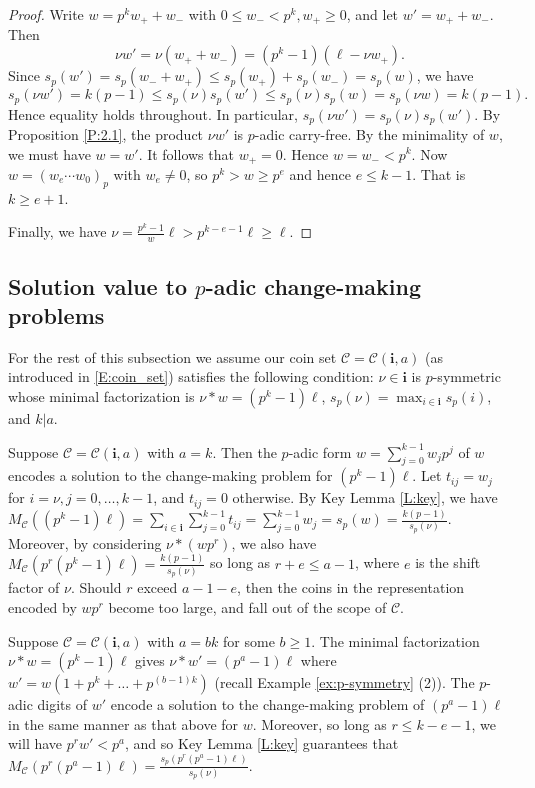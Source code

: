 \documentclass{amsart}
\numberwithin{equation}{section}
\newcommand{\cC}{\mathcal{C}}
\newcommand{\bi}{\mathbf{i}}
\theoremstyle{plain}
\theoremstyle{definition}
\begin{document}
\begin{proof}
Write $w=p^kw_++w_-$ with $0\le w_-<p^k, w_+\ge 0$, and let $w'=w_++w_-$. 
Then $$\nu w'=\nu(w_+ + w_-)=(p^k-1)(\ell-\nu w_+).$$
Since $s_p(w')=s_p(w_-+w_+)\le s_p(w_+)+s_p(w_-)=s_p(w)$, 
we have $$s_p(\nu w')=k(p-1)\le s_p(\nu)s_p(w')\le s_p(\nu) s_p(w)=s_p(\nu w)=k(p-1).$$ 
Hence equality holds throughout. In particular, $s_p(\nu w')=s_p(\nu)s_p(w')$. 
By Proposition \ref{P:2.1}, the product $\nu w'$ is $p$-adic carry-free.
By the minimality of $w$, we must have $w=w'$. It follows that $w_+=0$. Hence 
$w=w_-<p^k$. 
Now $w=(w_e\cdots w_0)_p$ with $w_e\ne 0$, so $p^k>w\ge p^e$ and hence $e\le k-1$.
That is $k\ge e+1$. 

Finally, we have $\nu=\frac{p^k-1}{w}\ell >p^{k-e-1}\ell\ge \ell$. 
\end{proof}

\subsection{Solution value to $p$-adic change-making problems}

For the rest of this subsection 
we assume our coin set $\cC=\cC(\bi, a)$ (as introduced in \eqref{E:coin_set})
satisfies the following condition:
$\nu\in\bi$ is $p$-symmetric whose minimal factorization is
$\nu*w=(p^k-1)\ell$, $s_p(\nu)=\max_{i\in\bi}s_p(i)$, and $k|a$.


Suppose $\cC=\cC(\bi,a)$ with $a=k$.
Then the $p$-adic form $w=\sum_{j=0}^{k-1}w_jp^j$ of $w$ 
encodes a solution to the change-making problem for $(p^k-1)\ell$.
Let $t_{ij}=w_j$ for $i=\nu, j=0,\ldots,k-1$, and $t_{ij}=0$ otherwise.
By Key Lemma \ref{L:key}, we have
$M_{\cC}((p^k-1)\ell) = \sum_{i\in\bi}\sum_{j=0}^{k-1} t_{ij}=\sum_{j=0}^{k-1} w_j=s_p(w)=\frac{k(p-1)}{s_p(\nu)}$.
Moreover, by considering $\nu * (wp^r)$, we also have
$M_\cC(p^r(p^k-1)\ell) = \frac{k(p-1)}{s_p(\nu)}$
so long as 
$r+e \le a-1$, where $e$ is the shift factor of $\nu$.
Should $r$ exceed $a-1-e$,
then the coins in the representation encoded by $wp^r$
become too large, and fall out of the scope of $\cC$.

Suppose $\cC=\cC(\bi,a)$ with $a=bk$ for some $b\ge 1$.
The minimal factorization $\nu*w=(p^k-1)\ell$ gives
$\nu*w'=(p^a-1)\ell
$
where $w' = w(1+p^k + \dots + p^{(b-1)k})$
(recall Example \ref{ex:p-symmetry} (2)).
The $p$-adic digits of $w'$ encode a solution to the change-making problem of $(p^a-1)\ell$ in the same manner as that above for $w$.
Moreover, so long as $r \le k-e-1$, we will have $p^r w' < p^a$,
and so Key Lemma \ref{L:key} guarantees
that $M_\cC(p^r(p^a-1)\ell) = \frac{s_p(p^r(p^a-1)\ell)}{s_p(\nu)}$.
\end{document}
